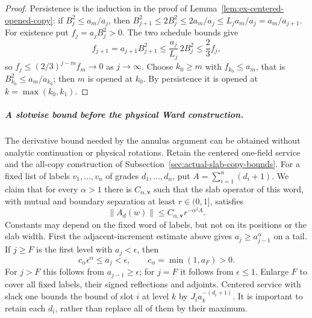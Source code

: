 \begin{proof}
Persistence is the induction in the proof of
Lemma~\ref{lem:ex-centered-opened-copy}: if $B_j^2\le a_m/a_j$, then
$B_{j+1}^2\le2B_j^2\le2a_m/a_j\le L_ja_m/a_j=a_m/a_{j+1}$.  For existence
put $f_j=a_jB_j^2>0$.  The two schedule bounds give
\[
 f_{j+1}=a_{j+1}B_{j+1}^2\le\frac{a_j}{L_j}\,2B_j^2\le\frac23f_j,
\]
so $f_j\le(2/3)^{j-m}f_m\to0$ as $j\to\infty$.  Choose $k_0\ge m$ with
$f_{k_0}\le a_m$, that is $B_{k_0}^2\le a_m/a_{k_0}$; then $m$ is opened
at $k_0$.  By persistence it is opened at $k=\max(k_0,k_1)$.
\end{proof}

\subparagraph{A slotwise bound before the physical Ward construction.}
The derivative bound needed by the annulus argument can be obtained
without analytic continuation or physical rotations. Retain the
centered one-field service and the all-copy construction of
Subsection~\ref{sec:actual-slab-copy-bounds}. For a fixed list of labels
$v_1,\ldots,v_n$ of grades $d_1,\ldots,d_n$, put
$A=\sum_{i=1}^n(d_i+1)$. We claim that for every $\alpha>1$ there is
$C_{\alpha,\boldsymbol v}$ such that the slab operator of this word,
with mutual and boundary separation at least $r\in(0,1]$, satisfies
\begin{equation}\label{eq:scribe-slotwise-slab}
 \|A_d(w)\|\le C_{\alpha,\boldsymbol v} r^{-\alpha^2 A}.
\end{equation}
Constants may depend on the fixed word of labels, but not on its
positions or the slab width. First the adjacent-increment estimate
above gives $a_j\ge a_{j-1}^{\alpha}$ on a tail. If $j\ge F$ is the
first level with $a_j<\epsilon$, then
\[
       c_\alpha\epsilon^\alpha\le a_j<\epsilon,
       \qquad c_\alpha=\min(1,a_F)>0.
\]
For $j>F$ this follows from $a_{j-1}\ge\epsilon$; for $j=F$ it follows
from $\epsilon\le1$. Enlarge $F$ to cover all fixed labels, their
signed reflections and adjoints. Centered service with slack one
bounds the bound of slot $i$ at level $k$ by
$J_i a_k^{-(d_i+1)}$. It is important to retain each $d_i$, rather than
replace all of them by their maximum.

